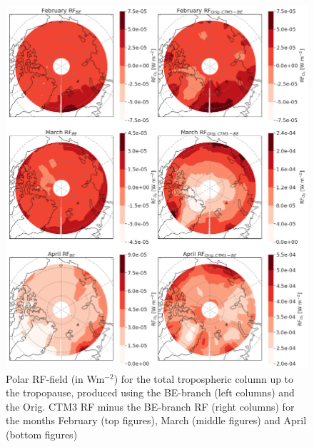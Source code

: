 \begin{figure}[ht]
    \centering
    \includegraphics{Chapter6_Results/images/RF/BEOrig_RF_polar_FebApr_2001.png}
    \caption{Polar RF-field (in Wm$^{-2}$) for the total tropospheric column up to the tropopause, produced using the BE-branch (left columns) and the Orig. CTM3 RF minus the BE-branch RF (right columns) for the months February (top figures), March (middle figures) and April (bottom figures)}
    \label{fig:BE_RF_global_FebApr_2001}
\end{figure}